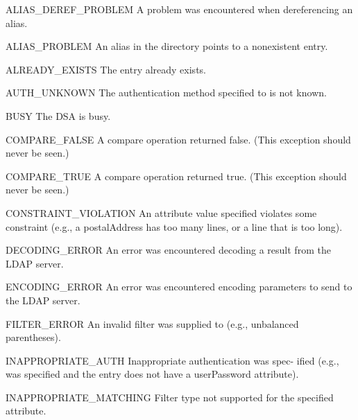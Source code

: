 \begin{excdesc}{ALIAS_DEREF_PROBLEM}
	A  problem was encountered when dereferencing an alias.
\end{excdesc}
\begin{excdesc}{ALIAS_PROBLEM}
	An alias in the directory points to a nonexistent entry.
\end{excdesc}
\begin{excdesc}{ALREADY_EXISTS}
	The entry already exists.
\end{excdesc}
\begin{excdesc}{AUTH_UNKNOWN}
	The authentication method specified to  is not known.
\end{excdesc}
\begin{excdesc}{BUSY}
	The DSA is busy.
\end{excdesc}
\begin{excdesc}{COMPARE_FALSE}
	A compare operation returned false.
	(This exception should never be seen.)
\end{excdesc}
\begin{excdesc}{COMPARE_TRUE}
	A compare operation returned true.
	(This exception should never be seen.)
\end{excdesc}
\begin{excdesc}{CONSTRAINT_VIOLATION}
	An attribute value specified  violates
	some constraint (e.g., a postalAddress
	has too many lines, or a line that  is
	too long).
\end{excdesc}
\begin{excdesc}{DECODING_ERROR}
	An  error  was  encountered decoding a
	result from the LDAP server.
\end{excdesc}
\begin{excdesc}{ENCODING_ERROR}
	An   error  was  encountered  encoding
	parameters to send to the LDAP server.
\end{excdesc}
\begin{excdesc}{FILTER_ERROR}
	An  invalid  filter  was  supplied  to
	 (e.g., unbalanced parentheses).
\end{excdesc}
\begin{excdesc}{INAPPROPRIATE_AUTH}
	Inappropriate authentication was spec-
	ified   (e.g.,    was
	specified and the entry does not  have
	a userPassword attribute).
\end{excdesc}
\begin{excdesc}{INAPPROPRIATE_MATCHING}
	   Filter  type  not  supported  for  the specified attribute.
\end{excdesc}
